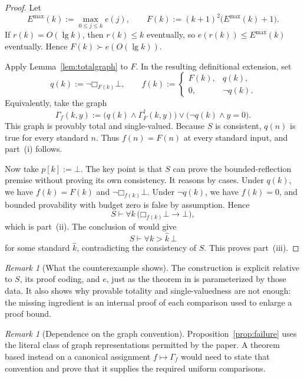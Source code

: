 \documentclass[11pt]{article}
\theoremstyle{definition}
\theoremstyle{remark}
\newtheorem{remark}[theorem]{Remark}
\newcommand{\botf}{\bot}
\newcommand{\Boxb}[1]{\mathord{\Box}_{#1}}
\newcommand{\CritchPBLRef}{\cite[Theorem~4.2]{Critch}}
\begin{document}
\begin{proof}
Let
\[
  E^{\max}(k):=\max_{0\leq j\leq k}e(j),
  \qquad
  F(k):=(k+1)^2\bigl(E^{\max}(k)+1\bigr).
\]
If $r(k)=O(\lg k)$, then $r(k)\leq k$ eventually, so $e(r(k))\leq E^{\max}(k)$ eventually.  Hence $F(k)\succ e(O(\lg k))$.

Apply Lemma~\ref{lem:totalgraph} to $F$.  In the resulting definitional extension, set
\[
  q(k):=\neg\Boxb{F(k)}\botf,
  \qquad
  f(k):=
  \begin{cases}
    F(k),&q(k),\\
    0,&\neg q(k).
  \end{cases}
\]
Equivalently, take the graph
\[
  \Gamma_f(k,y):=
  \bigl(q(k)\wedge\Gamma_F^{\dagger}(k,y)\bigr)
  \vee
  \bigl(\neg q(k)\wedge y=0\bigr).
\]
This graph is provably total and single-valued.  Because $S$ is consistent, $q(n)$ is true for every standard $n$.  Thus $f(n)=F(n)$ at every standard input, and part~(i) follows.

Now take $p[k]:=\botf$.  The key point is that $S$ can prove the bounded-reflection premise without proving its own consistency.  It reasons by cases.  Under $q(k)$, we have $f(k)=F(k)$ and $\neg\Boxb{f(k)}\botf$.  Under $\neg q(k)$, we have $f(k)=0$, and bounded provability with budget zero is false by assumption.  Hence
\[
  S\vdash\forall k\,
  \bigl(\Boxb{f(k)}\botf\to\botf\bigr),
\]
which is part~(ii).  The conclusion of \CritchPBLRef{} would give
\[
  S\vdash\forall k>\widehat{k}\,\botf
\]
for some standard $\widehat{k}$, contradicting the consistency of $S$.  This proves part~(iii).
\end{proof}

\begin{remark}[What the counterexample shows]
The construction is explicit relative to $S$, its proof coding, and $e$, just as the theorem in \CritchPBLRef{} is parameterized by those data.  It also shows why provable totality and single-valuedness are not enough: the missing ingredient is an internal proof of each comparison used to enlarge a proof bound.
\end{remark}

\begin{remark}[Dependence on the graph convention]
Proposition~\ref{prop:failure} uses the literal class of graph representations permitted by the paper.  A theorem based instead on a canonical assignment $f\mapsto\Gamma_f$ would need to state that convention and prove that it supplies the required uniform comparisons.
\end{remark}
\end{document}
